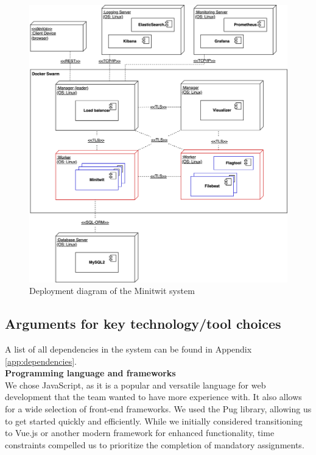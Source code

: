\begin{figure}[]
    \centering
    \includegraphics[width=\linewidth]{images/deployment-diagram.png}
    \caption{Deployment diagram of the Minitwit system}
    \label{fig:deployment-diagram}
\end{figure}


\subsection{Arguments for key technology/tool choices}

A list of all dependencies in the system can be found in Appendix \ref{app:dependencies}. \\


\textbf{Programming language and frameworks}\\
We chose JavaScript, as it is a popular and versatile language for web development that the team wanted to have more experience with. It also allows for a wide selection of front-end frameworks. We used the Pug library, allowing us to get started quickly and efficiently. While we initially considered transitioning to Vue.js or another modern framework for enhanced functionality, time constraints compelled us to prioritize the completion of mandatory assignments.\\ 

